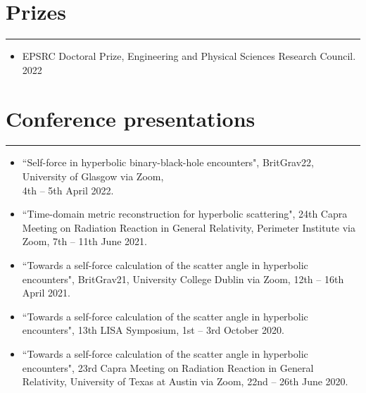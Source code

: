 \documentclass[10.5pt, oneside]{article}   	%
\begin{document}

{\color{Sectioncolour}
\section*{Prizes}
\vspace{-3mm}
\noindent\rule{\linewidth}{0.6pt}}
\begin{itemize}
\item EPSRC Doctoral Prize, Engineering and Physical Sciences Research Council. \hfill 2022
\end{itemize}

 
 {\color{Sectioncolour}
\section*{Conference presentations}
\vspace{-3mm}
\noindent\rule{\linewidth}{0.6pt}}
\begin{itemize}
\item ``Self-force in hyperbolic binary-black-hole encounters", BritGrav22, University of Glasgow via Zoom, \\ 4th -- 5th April 2022. \href{https://www.youtube.com/watch?v=zZEblkjb5IM}{}
\item ``Time-domain metric reconstruction for hyperbolic scattering", 24th Capra Meeting on Radiation Reaction in General Relativity, Perimeter Institute via Zoom, 7th -- 11th June 2021. \href{https://pirsa.org/21060058}{}
\item ``Towards a self-force calculation of the scatter angle in hyperbolic encounters", BritGrav21, University College Dublin via Zoom, 12th -- 16th April 2021.
\item``Towards a self-force calculation of the scatter angle in hyperbolic encounters", 13th LISA Symposium, 1st -- 3rd October 2020. \href{https://lisasymposium13.lisamission.org/presentations/i0xMnRFWi7WKbO5f01caGDH0zPK2/7qz7uYC3qHuzj9AsC49h}{}
\item ``Towards a self-force calculation of the scatter angle in hyperbolic encounters", 23rd Capra Meeting on Radiation Reaction in General Relativity, University of Texas at Austin via Zoom, 22nd -- 26th June 2020. \href{https://www.youtube.com/watch?v=HB-Rw5kRUfg&t=11311s}{}
\end{itemize} 
 
\end{document}
